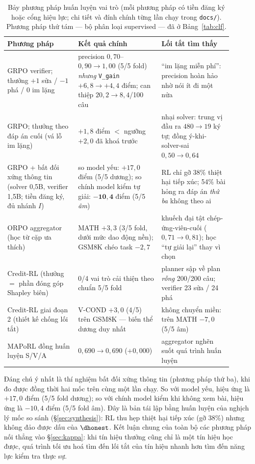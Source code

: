 \begin{table}[t]\centering\small
\begin{tabular}{p{0.29\linewidth}p{0.33\linewidth}p{0.29\linewidth}}\toprule
Phương pháp & Kết quả chính & Lối tắt tìm thấy\\\midrule
GRPO verifier; thưởng $+1$ sửa / $-1$ phá / $0$ im lặng &
precision $0{,}70$--$0{,}90 \to 1{,}00$ (5/5 fold) \emph{nhưng} \texttt{V\_gain}
$+6{,}8 \to +4{,}4$ điểm; can thiệp $20{,}2 \to 8{,}4$/100 câu &
``im lặng miễn phí'': precision hoàn hảo nhờ nói ít đi một nửa\\[2pt]
GRPO; thưởng theo đáp án cuối (vá lỗ im lặng) &
$+1{,}8$ điểm $<$ ngưỡng $+2{,}0$ đã khoá trước &
nhại solver: trung vị đầu ra $480 \to 19$ ký tự; đồng ý-khi-solver-sai $0{,}50 \to 0{,}64$\\[2pt]
GRPO + bất đối xứng thông tin (solver 0,5B, verifier 1,5B; tiền đăng ký, đủ nhánh $I$) &
so model yếu: $+17{,}0$ điểm (5/5 dương); so chính model kiểm tự giải: $\mathbf{-10{,}4}$
điểm (5/5 \emph{âm}) &
RL chỉ gỡ 38\% thiệt hại tiếp xúc; 54\% bài hỏng ra đáp án \emph{thứ ba} không theo ai\\[2pt]
ORPO aggregator (học từ cặp ưa thích) &
MATH $+3{,}3$ (3/5 fold, dưới mức dao động nền); GSM8K chéo task $-2{,}7$ &
khuếch đại tật chép-ứng-viên-cuối ($0{,}71 \to 0{,}81$); học ``tự giải lại'' thay vì chọn\\[2pt]
Credit-RL (thưởng $=$ phần đóng góp Shapley biên) &
0/4 vai trò cải thiện theo chuẩn 5/5 fold &
planner sập về plan \emph{rỗng} 200/200 câu; verifier 23 sửa / 24 phá\\[2pt]
Credit-RL giai đoạn 2 (thiết kế chống lối tắt) &
V-COND $+3{,}0$ (4/5) trên GSM8K --- biến thể dương duy nhất &
không chuyển miền: trên MATH $-7{,}0$ (5/5 âm)\\[2pt]
MAPoRL đồng huấn luyện S/V/A &
$0{,}690 \to 0{,}690$ ($+0{,}000$) &
aggregator nghẽn suốt quá trình huấn luyện\\\bottomrule
\end{tabular}
\caption{Bảy phương pháp huấn luyện vai trò (mỗi phương pháp có tiền đăng ký hoặc cổng hiệu lực;
chi tiết và đính chính từng lần chạy trong \texttt{docs/}). Phương pháp thứ tám ---
bộ phân loại supervised --- đã ở Bảng~\ref{tab:clf}.}
\label{tab:rl}
\end{table}

Đáng chú ý nhất là thí nghiệm bất đối xứng thông tin (phương pháp thứ ba), khi đo được đồng thời hai mốc trên cùng một lần chạy. So với model yếu, hiệu ứng là $+17{,}0$ điểm (5/5 fold dương); so với chính model kiểm khi không xem bài, hiệu ứng là $-10{,}4$ điểm (5/5 fold âm). Đây là bản tái lập bằng huấn luyện của nghịch lý mốc so sánh (\S\ref{sec:synthesis}): RL thu hẹp thiệt hại tiếp xúc (gỡ 38\%) nhưng không đảo được dấu của $\dhonest$. Kết luận chung của toàn bộ các phương pháp nối thẳng vào \S\ref{sec:kappa}: khi tín hiệu thưởng cũng chỉ là một tín hiệu học được, quá trình tối ưu hoá tìm đến lối tắt của tín hiệu nhanh hơn tìm đến năng lực kiểm tra thực sự.
